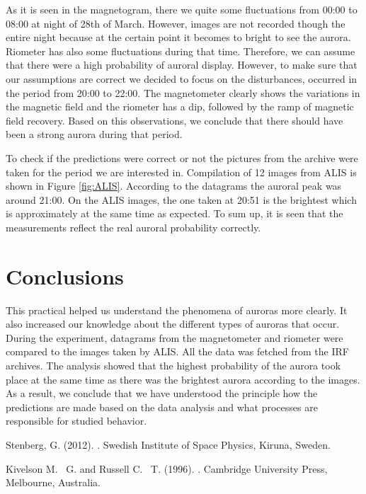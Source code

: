 \documentclass{article}
\begin{document}
As it is seen in the magnetogram, there we quite some fluctuations from 00:00 to 08:00 at night of 28th of March. However, images are not recorded though the entire night because at the certain point it becomes to bright to see the aurora. Riometer has also some fluctuations during that time. Therefore, we can assume that there were a high probability of auroral display. However, to make sure that our assumptions are correct we decided to focus on the disturbances, occurred in the period from 20:00 to 22:00. The magnetometer clearly shows the variations in the magnetic field and the riometer has a dip, followed by the ramp of magnetic field recovery. Based on this observations, we conclude that there should have been a strong aurora during that period.

To check if the predictions were correct or not the pictures from the archive were taken for the period we are interested in. Compilation of 12 images from ALIS is shown in Figure \ref{fig:ALIS}. According to the datagrams the auroral peak was around 21:00. On the ALIS images, the one taken at 20:51 is the brightest which is approximately at the same time as expected. To sum up, it is seen that the measurements reflect the real auroral probability correctly.




\section{Conclusions}
This practical helped us understand the phenomena of auroras more clearly. It also increased our knowledge about the different types of auroras that occur. During the experiment, datagrams from the magnetometer and riometer were compared to the images taken by ALIS. All the data was fetched from the IRF archives. The analysis showed that the highest probability of the aurora took place at the same time as there was the brightest aurora according to the images. As a result, we conclude that we have understood the principle how the predictions are made based on the data analysis and what processes are responsible for studied behavior.


\begin{thebibliography}{9}

Stenberg, G.  (2012).
.
\newblock Swedish Institute of Space Physics, Kiruna, Sweden.

Kivelson M. ~G. and Russell C. ~T.  (1996).
.
\newblock Cambridge University Press, Melbourne, Australia.

\end{thebibliography}
\end{document}
